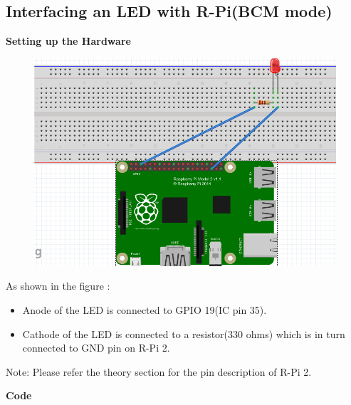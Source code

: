 \documentclass[11pt,a4paper]{article}
\begin{document}
	 \subsection{Interfacing an LED with R-Pi(BCM mode)}
	 \textbf{Setting up the Hardware}
	 \begin{figure}[h!]
	 	\includegraphics[scale=0.4]{Led.png}
	 	\centering
	 \end{figure}
	 \newline
	 As shown in the figure :
	 \begin{itemize}
	 	\item Anode of the LED is connected to GPIO 19(IC pin 35).
	 	\item Cathode of the LED is connected to a resistor(330 ohms) which is in turn connected to GND pin on R-Pi 2.
	\end{itemize}
		Note: Please refer the theory section for the pin description of R-Pi 2.
	
	\newpage
	\flushleft
	\textbf{Code}
	
	
	\newpage
\end{document}

